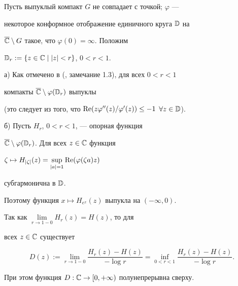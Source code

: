  


\begin{note} Пусть выпуклый компакт $G$ не совпадает с точкой; $\varphi$ --- 


некоторое конформное отображение единичного круга $\Bbb D$ на


$\overline{\Bbb C}\setminus G$ такое, что $\varphi(0)=\infty$. Положим 


$\Bbb D_r:=\{z\in\Bbb C\mid |z|<r\}$, $0<r<1$. 


 


а) Как отмечено в (\cite{Kor3}, замечание 1.3), для всех $0<r<1$ 


компакты $\overline{\Bbb C}\setminus\varphi(\Bbb D_r)$ выпуклы 


(это следует из того, что $\R(z\varphi''(z)/\varphi'(z))\le -1$ $\forall 


z\in\Bbb D$). 


 


б) Пусть $H_r$, $0<r<1$, --- опорная функция 


$\overline{\Bbb C}\setminus\varphi(\Bbb D_r)$. Для всех $z\in\Bbb C$ функция 


$\zeta\mapsto H_{|\zeta|}(z)=\sup\limits_{|a|=1}\operatorname{Re}(\varphi(\zeta a)z)$ 


субгармонична в $\Bbb D$. 


Поэтому функция $x\mapsto H_{e^x}(z)$ выпукла на $(-\infty,0)$. 


Так как $\lim\limits_{r\to 1-0}H_r(z)=H(z)$, то для 


всех $z\in\Bbb C$ существует 


%


\begin{equation} 


D(z):=\lim_{r\to 1-0}\frac{H_r(z)-H(z)}{-\log r}= 


\inf_{0<r<1}\frac{H_r(z)-H(z)}{-\log r}. 


\end{equation} 


%


При этом функция $D:\Bbb C\to[0,+\infty)$ полунепрерывна сверху. 


\end{note} 


 



